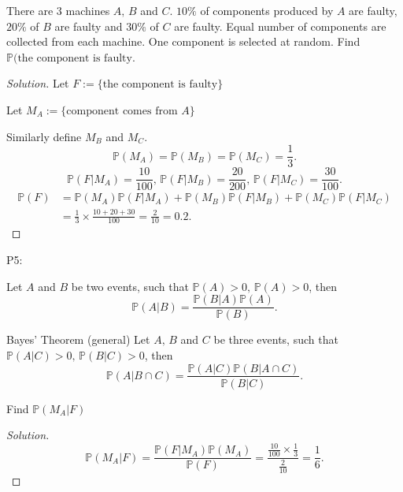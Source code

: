 \documentclass[10pt, a4paper]{article}
\begin{document}
\begin{example}
    There are $3$ machines $A,\, B$ and $C$. $10\%$ of components produced by $A$ are faulty, $20\%$ of $B$ are faulty and $30\%$ of $C$ are faulty.
    Equal number of components are collected from each machine. One component is selected at random. Find $\mathbb{P}(\text{the component is faulty}$.

    \begin{proof}[Solution]\renewcommand{\qedsymbol}{}
        Let $F := \{\text{the component is faulty}\}$

        Let $M_A := \{\text{component comes from $A$}\}$

        Similarly define $M_B$ and $M_C$.
        \[
        \mathbb{P}(M_A) = \mathbb{P}(M_B) = \mathbb{P}(M_C) = \frac{1}{3}.
        \]
        \[
        \mathbb{P}(F | M_A) = \frac{10}{100},\,\mathbb{P}(F | M_B) = \frac{20}{200},\,\mathbb{P}(F | M_C) = \frac{30}{100}.
        \]
        \begin{align*}
        \mathbb{P}(F) &= \mathbb{P}(M_A)\mathbb{P}(F | M_A) + \mathbb{P}(M_B)\mathbb{P}(F | M_B) + \mathbb{P}(M_C)\mathbb{P}(F | M_C) \\
        &= \frac{1}{3}\times \frac{10 + 20 + 30}{100} = \frac{2}{10} = 0.2.
        \end{align*}
    \end{proof}
\end{example}

P5:
\begin{theorem}
    Let $A$ and $B$ be two events, such that $\mathbb{P}(A) > 0,\, \mathbb{P}(A) > 0$, then
    \[
    \mathbb{P}(A | B) = \frac{\mathbb{P}(B | A)\mathbb{P}(A)}{\mathbb{P}(B)}.
    \]

    Bayes' Theorem (general)
    Let $A,\, B$ and $C$ be three events, such that $\mathbb{P}(A | C) > 0,\, \mathbb{P}(B | C) > 0$, then
    \[
    \mathbb{P}(A | B \cap C) = \frac{\mathbb{P}(A | C)\mathbb{P}(B | A \cap C)}{\mathbb{P}(B | C)}.
    \]
\end{theorem}

\begin{example}
    Find $\mathbb{P}(M_A | F)$
    \begin{proof}[Solution]\renewcommand{\qedsymbol}{}
    \[
    \mathbb{P}(M_A | F) = \frac{\mathbb{P}(F | M_A)\mathbb{P}(M_A)}{\mathbb{P}(F)} = \frac{\frac{10}{100} \times \frac{1}{3}}{\frac{2}{10}} = \frac{1}{6}.
    \]
    \end{proof}
\end{example}
\end{document}
